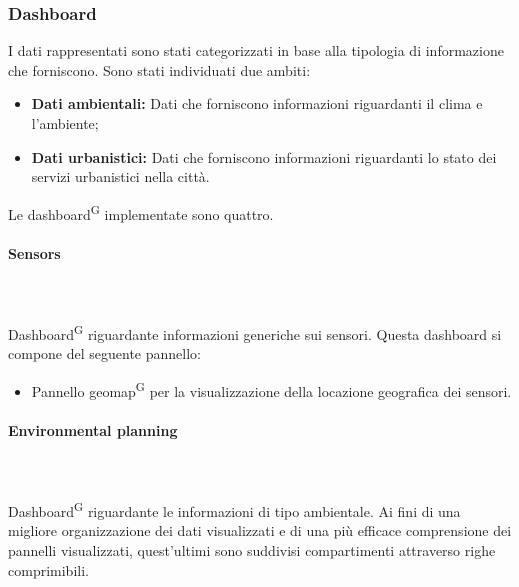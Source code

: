 \documentclass[8pt]{article}
\newcommand{\glossterm}[1]{#1\textsuperscript{G}} %
\newcommand{\subsubsubsection}[1]{\paragraph{#1}\mbox{}\\\\}
\begin{document}
\subsubsection{Dashboard}
I dati rappresentati sono stati categorizzati in base alla tipologia di informazione che forniscono. Sono stati individuati due ambiti:
\begin{itemize}
	\setlength\itemsep{0em}
    \item \textbf{Dati ambientali:} Dati che forniscono informazioni riguardanti il clima e l'ambiente;
    \item \textbf{Dati urbanistici:} Dati che forniscono informazioni riguardanti lo stato dei servizi urbanistici nella città.
\end{itemize}
Le \glossterm{dashboard} implementate sono quattro.
\subsubsubsection{Sensors} 
\glossterm{Dashboard} riguardante informazioni generiche sui sensori. Questa dashboard si compone del seguente pannello:
\begin{itemize}
	\setlength\itemsep{0em}
    \item Pannello \glossterm{geomap} per la visualizzazione della locazione geografica dei sensori.
\end{itemize}
\subsubsubsection{Environmental planning} 
\glossterm{Dashboard} riguardante le informazioni di tipo ambientale.
Ai fini di una migliore organizzazione dei dati visualizzati e di una più efficace comprensione dei pannelli visualizzati, quest'ultimi sono suddivisi compartimenti attraverso righe comprimibili.
\end{document}
